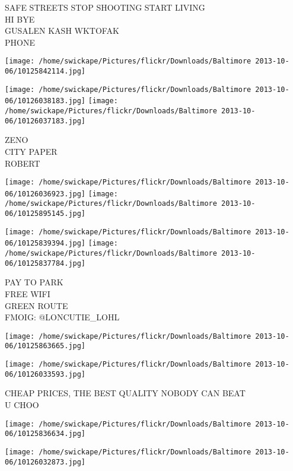 \documentclass[10pt,letterpaper]{article}
\begin{document}
SAFE STREETS STOP SHOOTING START LIVING\\
HI BYE\\
GUSALEN KASH WKTOFAK\\
PHONE\\
\pagebreak

\texttt{[image: /home/swickape/Pictures/flickr/Downloads/Baltimore 2013-10-06/10125842114.jpg]}

\vspace{0.25in}
\texttt{[image: /home/swickape/Pictures/flickr/Downloads/Baltimore 2013-10-06/10126038183.jpg]}
\texttt{[image: /home/swickape/Pictures/flickr/Downloads/Baltimore 2013-10-06/10126037183.jpg]}

ZENO\\
CITY PAPER\\
ROBERT\\
\pagebreak

\texttt{[image: /home/swickape/Pictures/flickr/Downloads/Baltimore 2013-10-06/10126036923.jpg]}
\texttt{[image: /home/swickape/Pictures/flickr/Downloads/Baltimore 2013-10-06/10125895145.jpg]}

\texttt{[image: /home/swickape/Pictures/flickr/Downloads/Baltimore 2013-10-06/10125839394.jpg]}
\texttt{[image: /home/swickape/Pictures/flickr/Downloads/Baltimore 2013-10-06/10125837784.jpg]}

PAY TO PARK\\
FREE WIFI\\
GREEN ROUTE\\
FMOIG: @LONCUTIE\_LOHL\\
\pagebreak

\texttt{[image: /home/swickape/Pictures/flickr/Downloads/Baltimore 2013-10-06/10125863665.jpg]}

\vspace{0.25in}
\texttt{[image: /home/swickape/Pictures/flickr/Downloads/Baltimore 2013-10-06/10126033593.jpg]}

CHEAP PRICES, THE BEST QUALITY NOBODY CAN BEAT\\
U CHOO\\
\pagebreak

\texttt{[image: /home/swickape/Pictures/flickr/Downloads/Baltimore 2013-10-06/10125836634.jpg]}

\vspace{0.25in}
\texttt{[image: /home/swickape/Pictures/flickr/Downloads/Baltimore 2013-10-06/10126032873.jpg]}
\end{document}
